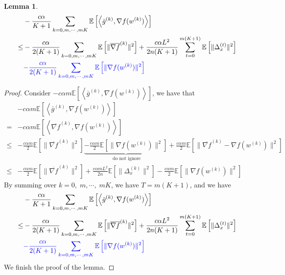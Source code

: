 \documentclass{article}
\newtheorem{lemma}[thm]{Lemma}
\newcommand{\EE}[1]{\mathbb{E}\left[#1\right]}
\newcommand{\norm}[1]{\| #1 \|}
\newcommand{\ip}[1]{\left\langle#1\right\rangle}
\begin{document}
\begin{lemma}
  \begin{align*}
    &-\frac{c\alpha }{K+1} \sum_{k=0,m,\cdots,mK}\EE{\ip{\bar{g}^{(k)},\nabla f(w^{(k)})}}\\\leq& -\frac{c\alpha }{2(K+1)}\sum_{k=0,m,\cdots,mK}\EE{\norm{\overline{\nabla f}^{(k)}}^2}+\frac{c\alpha L^2}{2n(K+1)}\sum_{t=0}^{m(K+1)}\EE{\norm{\Delta_x^{(t)}}^2}\\&\textcolor{blue}{-\frac{c\alpha}{2(K+1)}\sum_{k=0,m,\cdots,mK}\EE{\norm{\nabla f(w^{(k)})}^2}}
  \end{align*}
\end{lemma}

\begin{proof}
  Consider $-c\alpha m \EE{\ip{\bar{g}^{(k)},\nabla f(w^{(k)})}}$, we have that 
  \begin{align*}
    &-c\alpha m \EE{\ip{\bar{g}^{(k)},\nabla f(w^{(k)})}}\\=&-c\alpha m \EE{\ip{\overline{\nabla f}^{(k)},\nabla f(w^{(k)})}}\\ \leq & -\frac{c\alpha m}{2}\EE{\norm{\overline{\nabla f}^{(k)}}^2}\underbrace{-\frac{c\alpha m}{2}\EE{\norm{\nabla f(w^{(k)})}^2}}_{\text{ do not ignore}}+\frac{c\alpha m}{2}\EE{\norm{\overline{\nabla f}^{(k)}-\nabla f(w^{(k)})}^2}\\ \leq &-\frac{c\alpha m}{2}\EE{\norm{\overline{\nabla f}^{(k)}}^2}+\frac{c\alpha mL^2}{2n}\EE{\norm{\Delta_x^{(k)}}^2}-\frac{c\alpha m}{2}\EE{\norm{\nabla f(w^{(k)})}^2}
  \end{align*}
  By summing over $k=0,\;m,\cdots,\;mK$, we have $T=m(K+1)$, and we have
  \begin{align*}
    &-\frac{c\alpha }{K+1} \sum_{k=0,m,\cdots,mK}\EE{\ip{\bar{g}^{(k)},\nabla f(w^{(k)})}}\\\leq& -\frac{c\alpha }{2(K+1)}\sum_{k=0,m,\cdots,mK}\EE{\norm{\overline{\nabla f}^{(k)}}^2}+\frac{c\alpha L^2}{2n(K+1)}\sum_{t=0}^{m(K+1)}\EE{\norm{\Delta_x^{(t)}}^2}\\&\textcolor{blue}{-\frac{c\alpha}{2(K+1)}\sum_{k=0,m,\cdots,mK}\EE{\norm{\nabla f(w^{(k)})}^2}}
  \end{align*}
  We finish the proof of the lemma.
\end{proof}
\end{document}
